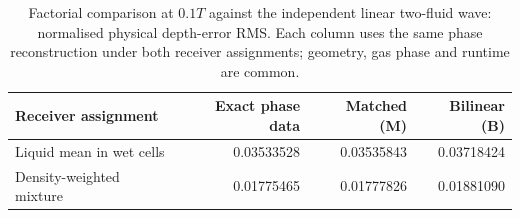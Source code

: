 \begin{table}[htbp]\centering\small
\caption{Factorial comparison at $0.1T$ against the independent
linear two-fluid wave: normalised physical depth-error RMS.
Each column uses the same phase reconstruction under both
receiver assignments; geometry, gas phase and runtime are common.}
\label{tab:mixture-factorial}
\begin{tabular}{lrrr}\toprule
Receiver assignment & Exact phase data & Matched (M) & Bilinear (B)\\\midrule
Liquid mean in wet cells & 0.03533528 & 0.03535843 & 0.03718424\\
Density-weighted mixture & 0.01775465 & 0.01777826 & 0.01881090\\
\bottomrule\end{tabular}
\end{table}
